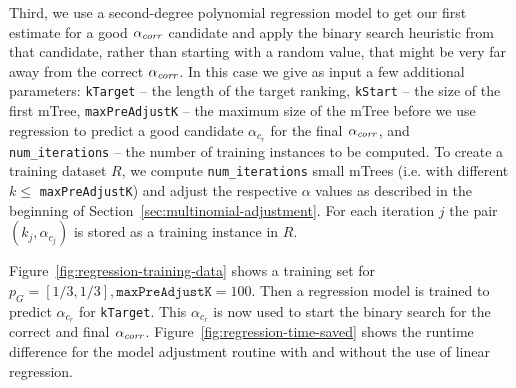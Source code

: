 Third, we use a second-degree polynomial regression model to get our first estimate for a good $\alpha_\textit{corr}$ candidate and apply the binary search heuristic from that candidate, rather than starting with a random value, that might be very far away from the correct $\alpha_\textit{corr}$.
%
In this case we give as input a few additional parameters: \texttt{kTarget} -- the length of the target ranking, \texttt{kStart} -- the size of the first mTree, \texttt{maxPreAdjustK} -- the maximum size of the mTree before we use regression to predict a good candidate $\alpha_{c_r}$ for the final $\alpha_\textit{corr}$, and \texttt{num\_iterations} -- the number of training instances to be computed.
%
To create a training dataset $R$, we compute \texttt{num\_iterations} small mTrees (i.e. with different $k \leq $ \texttt{maxPreAdjustK}) and adjust the respective $\alpha$ values as described in the beginning of Section~\ref{sec:multinomial-adjustment}.
%
For each iteration $j$ the pair $(k_j, \alpha_{c_j})$ is stored as a training instance in $R$.
%
\begin{figure}[h]
	\centering
	\hfill
	\hfill
	\caption{}
	\label{fig:regression_adjustment_benefits}
	\vspace{-3mm}
\end{figure}
%
Figure~\ref{fig:regression-training-data} shows a training set for $p_G=[1/3, 1/3], \texttt{maxPreAdjustK}=100$.
%
Then a regression model is trained to predict $\alpha_{c_r}$ for \texttt{kTarget}.
%
This $\alpha_{c_r}$ is now used to start the binary search for the correct and final $\alpha_\textit{corr}$.
%
Figure~\ref{fig:regression-time-saved} shows the runtime difference for the model adjustment routine with and without the use of linear regression.


